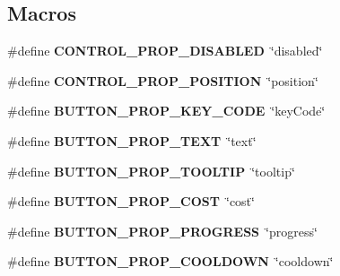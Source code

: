 \subsection*{Macros}
\begin{DoxyCompactItemize}
\item 
\mbox{\label{group__interactivity_ga3f49eb18e75ebb475db9730ea92d4eff}} 
\#define {\bfseries C\+O\+N\+T\+R\+O\+L\+\_\+\+P\+R\+O\+P\+\_\+\+D\+I\+S\+A\+B\+L\+ED}~\char`\"{}disabled\char`\"{}
\item 
\mbox{\label{group__interactivity_gaeca1e1064c50ed768e7e1348d5623e5c}} 
\#define {\bfseries C\+O\+N\+T\+R\+O\+L\+\_\+\+P\+R\+O\+P\+\_\+\+P\+O\+S\+I\+T\+I\+ON}~\char`\"{}position\char`\"{}
\item 
\mbox{\label{group__interactivity_gad991b814cef295319da932ddca58d4bb}} 
\#define {\bfseries B\+U\+T\+T\+O\+N\+\_\+\+P\+R\+O\+P\+\_\+\+K\+E\+Y\+\_\+\+C\+O\+DE}~\char`\"{}key\+Code\char`\"{}
\item 
\mbox{\label{group__interactivity_gad9cee389183b815d55386599351889ac}} 
\#define {\bfseries B\+U\+T\+T\+O\+N\+\_\+\+P\+R\+O\+P\+\_\+\+T\+E\+XT}~\char`\"{}text\char`\"{}
\item 
\mbox{\label{group__interactivity_ga6b00599219891813b6aca3b37f3a4e7d}} 
\#define {\bfseries B\+U\+T\+T\+O\+N\+\_\+\+P\+R\+O\+P\+\_\+\+T\+O\+O\+L\+T\+IP}~\char`\"{}tooltip\char`\"{}
\item 
\mbox{\label{group__interactivity_gaaec771e30146fd4d3fbd754eba549624}} 
\#define {\bfseries B\+U\+T\+T\+O\+N\+\_\+\+P\+R\+O\+P\+\_\+\+C\+O\+ST}~\char`\"{}cost\char`\"{}
\item 
\mbox{\label{group__interactivity_ga7d5b4b96c956c9b7674d3886317f5fd0}} 
\#define {\bfseries B\+U\+T\+T\+O\+N\+\_\+\+P\+R\+O\+P\+\_\+\+P\+R\+O\+G\+R\+E\+SS}~\char`\"{}progress\char`\"{}
\item 
\mbox{\label{group__interactivity_ga531f8bda8a8e1da8416d57ca99a7d1b8}} 
\#define {\bfseries B\+U\+T\+T\+O\+N\+\_\+\+P\+R\+O\+P\+\_\+\+C\+O\+O\+L\+D\+O\+WN}~\char`\"{}cooldown\char`\"{}

\end{DoxyCompactItemize}
